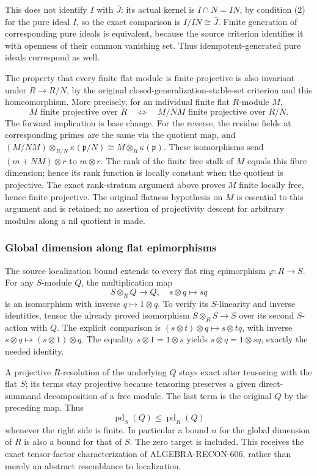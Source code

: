 This does not identify \(I\) with \(\bar J\): its actual kernel is \(I\cap N=IN\), by condition (2) for the pure ideal \(I\), so the exact comparison is \(I/IN\cong\bar J\). Finite generation of corresponding pure ideals is equivalent, because the source criterion identifies it with openness of their common vanishing set. Thus idempotent-generated pure ideals correspond as well.

The property that every finite flat module is finite projective is also invariant under \(R\to R/N\), by the original closed-generalization-stable-set criterion and this homeomorphism. More precisely, for an individual finite flat \(R\)-module \(M\), \[
M\text{ finite projective over }R
\quad\Longleftrightarrow\quad
M/NM\text{ finite projective over }R/N .
\] The forward implication is base change. For the reverse, the residue fields at corresponding primes are the same via the quotient map, and \((M/NM)\otimes_{R/N}\kappa(\mathfrak p/N)
\cong M\otimes_R\kappa(\mathfrak p)\). These isomorphisms send \((m+NM)\otimes\bar r\) to \(m\otimes r\). The rank of the finite free stalk of \(M\) equals this fibre dimension; hence its rank function is locally constant when the quotient is projective. The exact rank-stratum argument above proves \(M\) finite locally free, hence finite projective. The original flatness hypothesis on \(M\) is essential to this argument and is retained; no assertion of projectivity descent for arbitrary modules along a nil quotient is made.

\subsubsection{Global dimension along flat epimorphisms}\label{global-dimension-along-flat-epimorphisms}

The source localization bound extends to every flat ring epimorphism \(\varphi:R\to S\). For any \(S\)-module \(Q\), the multiplication map \[
S\otimes_RQ\longrightarrow Q,\quad s\otimes q\mapsto sq
\] is an isomorphism with inverse \(q\mapsto1\otimes q\). To verify its \(S\)-linearity and inverse identities, tensor the already proved isomorphism \(S\otimes_RS\to S\) over its second \(S\)-action with \(Q\). The explicit comparison is \((s\otimes t)\otimes q\mapsto s\otimes tq\), with inverse \(s\otimes q\mapsto(s\otimes1)\otimes q\). The equality \(s\otimes1=1\otimes s\) yields \(s\otimes q=1\otimes sq\), exactly the needed identity.

A projective \(R\)-resolution of the underlying \(Q\) stays exact after tensoring with the flat \(S\); its terms stay projective because tensoring preserves a given direct-summand decomposition of a free module. The last term is the original \(Q\) by the preceding map. Thus \[
\operatorname{pd}_S(Q)\le\operatorname{pd}_R(Q)
\] whenever the right side is finite. In particular a bound \(n\) for the global dimension of \(R\) is also a bound for that of \(S\). The zero target is included. This receives the exact tensor-factor characterization of ALGEBRA-RECON-606, rather than merely an abstract resemblance to localization.

